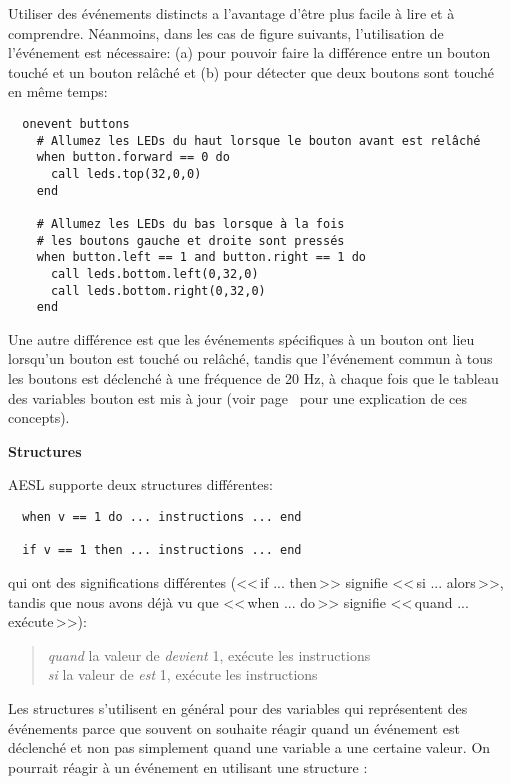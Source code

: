 Utiliser des événements distincts a l'avantage d'être plus facile à lire et à comprendre.
Néanmoins, dans les cas de figure suivants, l'utilisation de l'événement  est nécessaire:
(a) pour pouvoir faire la différence entre un bouton touché et un bouton relâché
et
(b) pour détecter que deux boutons sont touché en même temps:

\begin{footnotesize}
\begin{verbatim}
  onevent buttons
    # Allumez les LEDs du haut lorsque le bouton avant est relâché
    when button.forward == 0 do
      call leds.top(32,0,0)
    end

    # Allumez les LEDs du bas lorsque à la fois
    # les boutons gauche et droite sont pressés
    when button.left == 1 and button.right == 1 do
      call leds.bottom.left(0,32,0)
      call leds.bottom.right(0,32,0)
    end
\end{verbatim}
\end{footnotesize}

Une autre différence est que les événements spécifiques à un bouton
ont lieu lorsqu'un bouton est touché ou relâché,
tandis que l'événement commun à tous les boutons est déclenché à une fréquence de 20 Hz,
à chaque fois que le tableau des variables bouton est mis à jour (voir page~\pageref{pg.hz}
pour une explication de ces concepts).

\textbf{\large Structures }

AESL supporte deux structures différentes:
\begin{footnotesize}
\begin{verbatim}
  when v == 1 do ... instructions ... end

  if v == 1 then ... instructions ... end
\end{verbatim}
\end{footnotesize}
qui ont des significations différentes (<<\,if ... then\,>> signifie <<\,si ... alors\,>>, tandis que nous avons déjà vu que <<\,when ... do\,>> signifie <<\,quand ... exécute\,>>):
\begin{quote}
\emph{quand} la valeur de  \emph{devient} 1, exécute les instructions\\
\emph{si} la valeur de  \emph{est} 1, exécute les instructions
\end{quote}

Les structures  s'utilisent en général pour des variables qui représentent des événements
parce que souvent on souhaite réagir quand un événement est déclenché et non pas simplement quand une variable a une certaine valeur.
On pourrait réagir à un événement  en utilisant une structure :

